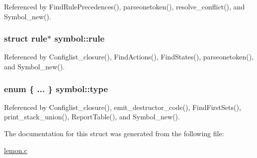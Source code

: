Referenced by Find\-Rule\-Precedences(), parseonetoken(), resolve\-\_\-conflict(), and Symbol\-\_\-new().

\hypertarget{structsymbol_a15c02dd88e3c480c918854efb5a803d6}{
\subsubsection[{rule}]{\setlength{\rightskip}{0pt plus 5cm}struct {\bf rule}$\ast$ symbol\-::rule}}\label{structsymbol_a15c02dd88e3c480c918854efb5a803d6}


Referenced by Configlist\-\_\-closure(), Find\-Actions(), Find\-States(), parseonetoken(), and Symbol\-\_\-new().

\hypertarget{structsymbol_af7354af68ac51816c1823dd6172f9b54}{
\subsubsection[{type}]{\setlength{\rightskip}{0pt plus 5cm}enum \{ ... \}   symbol\-::type}}\label{structsymbol_af7354af68ac51816c1823dd6172f9b54}


Referenced by Configlist\-\_\-closure(), emit\-\_\-destructor\-\_\-code(), Find\-First\-Sets(), print\-\_\-stack\-\_\-union(), Report\-Table(), and Symbol\-\_\-new().



The documentation for this struct was generated from the following file\-:\begin{DoxyCompactItemize}
\item 
\hyperlink{lemon_8c}{lemon.\-c}\end{DoxyCompactItemize}
